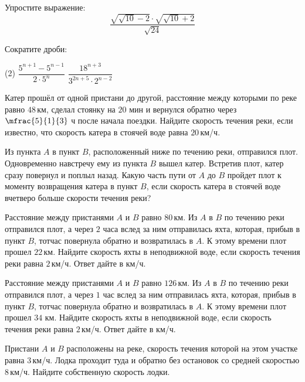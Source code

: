 \begin{class}[number=4]
	\begin{listofex}
		\item Упростите выражение:
			\[\dfrac{\sqrt{\sqrt{10}-2}\cdot\sqrt{\sqrt{10}+2}}{\sqrt{24}}\]
		\item Сократите дроби:
		\begin{tasks}(2)
			\task \( \dfrac{5^{n+1}-5^{n-1}}{2\cdot5^n} \)
			\task \( \dfrac{18^{n+3}}{3^{2n+5}\cdot2^{n-2}} \)
		\end{tasks}
		\item Катер прошёл от одной пристани до другой, расстояние между которыми по реке равно \( 48 \) км, сделал стоянку на \( 20 \) мин и вернулся обратно через \( \mfrac{5}{1}{3} \) ч после начала поездки. Найдите скорость течения реки, если известно, что скорость катера в стоячей воде равна \( 20 \) км/ч.
		\item Из пункта \( A \) в пункт \( B \), расположенный ниже по течению реки, отправился плот. Одновременно навстречу ему из пункта \( B \) вышел катер. Встретив плот, катер сразу повернул и поплыл назад. Какую часть пути от \( A \) до \( B \) пройдет плот к моменту возвращения катера в пункт \( B \), если скорость катера в стоячей воде вчетверо больше скорости течения реки?
		\item Расстояние между пристанями \( A \) и \( B \) равно \( 80 \) км. Из \( A \) в \( B \) по течению реки отправился плот, а через \( 2 \) часа вслед за ним отправилась яхта, которая, прибыв в пункт \( B \), тотчас повернула обратно и возвратилась в \( A \). К этому времени плот прошел \( 22 \) км. Найдите скорость яхты в неподвижной воде, если скорость течения реки равна \( 2 \) км/ч. Ответ дайте в км/ч.
		\item Расстояние между пристанями \( A \) и \( B \) равно \( 126 \) км. Из \( A \) в \( B \) по течению реки отправился плот, а через \( 1 \) час вслед за ним отправилась яхта, которая, прибыв в пункт \( B \), тотчас повернула обратно и возвратилась в \( A \). К этому времени плот прошел \( 34  \) км. Найдите скорость яхты в неподвижной воде, если скорость течения реки равна \( 2 \) км/ч. Ответ дайте в км/ч.
		\item Пристани \( A \) и \( B \) расположены на реке, скорость течения которой на этом участке равна \( 3 \) км/ч. Лодка проходит туда и обратно без остановок со средней скоростью \( 8 \) км/ч. Найдите собственную скорость лодки.
	\end{listofex}
\end{class}

